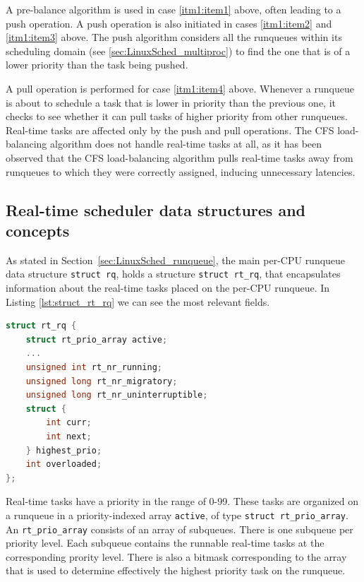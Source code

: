 A pre-balance algorithm is used in case \ref{itm1:item1} above, often
leading to a push operation.  A push operation is also initiated in
cases \ref{itm1:item2} and \ref{itm1:item3} above.  The push algorithm
considers all the runqueues within its scheduling domain (see
\ref{sec:LinuxSched_multiproc}) to find the one that is of a lower
priority than the task being pushed.

A pull operation is performed for case \ref{itm1:item4}
above. Whenever a runqueue is about to schedule a task that is lower
in priority than the previous one, it checks to see whether it can
pull tasks of higher priority from other runqueues.  Real-time tasks
are affected only by the push and pull operations. The CFS
load-balancing algorithm does not handle real-time tasks at all, as it
has been observed that the CFS load-balancing algorithm pulls
real-time tasks away from runqueues to which they were correctly
assigned, inducing unnecessary latencies.

\subsection{Real-time scheduler data structures and concepts\label{sec:RT_SCHED_STRUCTURES}}

As stated in Section~\ref{sec:LinuxSched_runqueue}, the main per-CPU
runqueue data structure \texttt{struct rq}, holds a structure
\texttt{struct rt\_rq}, that encapsulates information about the
real-time tasks placed on the per-CPU runqueue. In Listing
\ref{lst:struct_rt_rq} we can see the most relevant fields.

\begin{lstlisting}[language=C, caption={\texttt{struct rt\_rq}},
                        label={lst:struct_rt_rq}]
struct rt_rq {
	struct rt_prio_array active;
	...
	unsigned int rt_nr_running;
	unsigned long rt_nr_migratory;
	unsigned long rt_nr_uninterruptible;
	struct {
		int curr;
		int next;
	} highest_prio;
	int overloaded;
};
\end{lstlisting}

Real-time tasks have a priority in the range of 0-99. These tasks are
organized on a runqueue in a priority-indexed array \texttt{active},
of type \texttt{struct rt\_prio\_array}.  An \texttt{rt\_prio\_array}
consists of an array of subqueues. There is one subqueue per priority
level. Each subqueue contains the runnable real-time tasks at the
corresponding prority level. There is also a bitmask corresponding to
the array that is used to determine
effectively the highest priority task on the runqueue.

